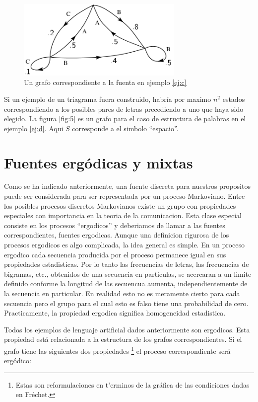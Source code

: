 \begin{figure}[!ht]
\centerline{\includegraphics[width=80mm]{Imagenes/SinComentarios/Pagina8-Figura4.png}}
\caption{Un grafo correspondiente a la fuenta en ejemplo \ref{ej:c}}
\label{fig:4}
\end{figure}

Si un ejemplo de un triagrama fuera construido, habr\'{i}a por maximo
$n^{2}$ estados correspondiendo a los posibles pares de letras
precediendo a uno que haya sido elegido. La figura \ref{fig:5} es un
grafo para el caso de estructura de palabras en el ejemplo
\ref{ej:d}. Aqui $S$ corresponde a el simbolo ``espacio''.

\clearpage

\chapter{Fuentes erg\'{o}dicas y mixtas}
\label{sec:5}

Como se ha indicado anteriormente, una fuente discreta para nuestros
propositos puede ser considerada para ser representada por un proceso
Markoviano. Entre los posibles procesos discretos Markovianos existe
un grupo con propiedades especiales con importancia en la teoria de la
comunicacion. Esta clase especial consiste en los procesos
``ergodicos'' y deberiamos de llamar a las fuentes correspondientes,
fuentes ergodicas. Aunque una definicion rigurosa de los procesos
ergodicos es algo complicada, la idea general es simple. En un proceso
ergodico cada secuencia producida por el proceso permanece igual en
sus propiedades estadisticas. Por lo tanto las frecuencias de letras,
las frecuencias de bigramas, etc., obtenidos de una secuencia en
particulas, se acercaran a un limite definido conforme la longitud de
las secuencua aumenta, independientemente de la secuencia en
particular. En realidad esto no es meramente cierto para cada
secuencia pero el grupo para el cual esto es falso tiene una
probabilidad de cero. Practicamente, la propiedad ergodica significa
homogeneidad estadistica.

Todos los ejemplos de lenguaje artificial dados anteriormente son
ergodicos. Esta propiedad est\'{a} relacionada a la estructura de los
grafos correspondientes. Si el grafo tiene las siguientes dos
propiedades \footnote{Estas son reformulaciones en t'{e}rminos de la
  gr\'{a}fica de las condiciones dadas en Fr\'{e}chet.} el proceso
correspondiente ser\'{a} erg\'{o}dico:

